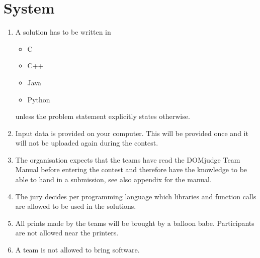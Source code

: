\documentclass[11pt]{report}
\begin{document}
\section{System}
\begin{enumerate}[label=\bfseries 4.4.\arabic*]
\item A solution has to be written in 
\begin{itemize}
	\item C
	\item C++
	\item Java
	\item Python
\end{itemize}
unless the problem statement explicitly states otherwise.
\item \label{input} Input data is provided on your computer. This will be provided once and it will not be uploaded again during the contest.
\item The organisation expects that the teams have read the DOMjudge Team Manual before entering the contest and therefore have the knowledge to be able to hand in a submission, see also appendix for the manual.
\item The jury decides per programming language which libraries and function calls are allowed to be used in the solutions.
\item All prints made by the teams will be brought by a balloon babe. Participants are not allowed near the printers.
\item \label{software}A team is not allowed to bring software.
\end{enumerate}
\end{document}

